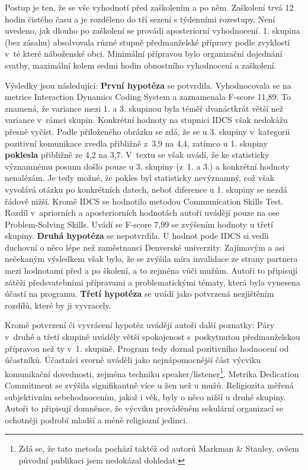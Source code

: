 Postup je ten, že se vše vyhodnotí před zaškolením a po něm. Zaškolení trvá 12
hodin čistého času a je rozděleno do tří sezení s týdenními rozestupy. Není
uvedeno, jak dlouho po zaškolení se provádí aposteriorní vyhodnocení. 1. skupina
(bez zásahu) absolvovala různé stupně předmanželské přípravy podle zvyklostí
v~té které náboženské obci. Minimální přípravou bylo organizační dojednání
svatby, maximální kolem sedmi hodin obnostního vyhodnocení a zaškolení.

Výsledky jsou následující:
{\bf První hypotéza} se potvrdila. Vyhodnocovala se na metrice Interaction Dynamics
Coding System a zaznamenala F-score 11,89. To znamená, že variance mezi 1. a 3.
skupinou byla téměř dvanáctkrát větší než variance v~rámci skupin. Konkrétní
hodnoty na stupnici IDCS však nedokážu přesně vyčíst. Podle přiloženého obrázku se zdá, že
se u 3. skupiny v~kategorii pozitivní komunikace zvedla přibližně z~3,9 na 4,4,
zatímco u 1. skupiny \textbf{poklesla} přibližně ze 4,2 na 3,7. V~textu se však uvádí,
že ke statisticky významnému posunu došlo pouze u 3. skupiny (z~1. a 3.) a
konkrétní hodnoty nenalézám. Je tedy možné, že pokles byl statisticky
nevýznamný, což však vyvolává otázku po konkrétních datech, neboť diference u 1.
skupiny se nezdá řádově nižší.
Kromě IDCS se hodnotilo metodou Communication Skills Test. Rozdíl v~apriorních a
aposteriorních hodnotách autoři uvádějí pouze na ose Problem-Solving Skills.
Uvádí se F-score 7,99 se zvýšením hodnoty u třetí skupiny.
{\bf Druhá hypotéza} se nepotvrdila. U hodnot pode IDCS si vedli duchovní o něco lépe
než zaměstnanci Denverské univerzity. Zajímavým a asi nečekaným výsledkem však
bylo, že se zvýšila míra invalidace ze strany partnera mezi hodnotami před a po
školení, a to zejména vůči mužům. Autoři to připisují zátěži předsvatebními
přípravami a problematickými tématy, která byla vynesena účastí na programu.
{\bf Třetí hypotéza} se uvádí jako potvrzená nezjištěním rozdílů, které by ji
vyvracely.

Kromě potvrzení či vyvrácení hypotéz uvádějí autoři další poznatky: Páry v~druhé
a třetí skupině uváděly větší spokojenost s~poskytnutou předmanželskou přípravou
než ty v~1. skupině. Program tedy doznal pozitivního hodnocení od účastníků.
Účastníci svorně uváděli jako nejnápomocnější část výcviku komunikační
dovednosti, zejména techniku speaker/listener\footnote{Zdá se, že tato metoda
pochází taktéž od autorů Markman \& Stanley, ovšem původní publikaci jsem
nedokázal dohledat.}. Metrika Dedication Commitment se
zvýšila signifikantně více u žen než u mužů. Religiozita měřená subjektivním
sebehodnocením, jakož i věk, byly o něco nižší u druhé skupiny. Autoři to
připisují domněnce, že výcviku prováděném sekulární organizací se ochotněji
podrobí mladší a méně religiozní jedinci.

